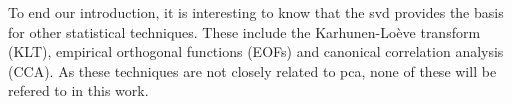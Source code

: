 To end our introduction, it is interesting to know that the \gls{svd} provides the basis for other statistical techniques.
These include the Karhunen-Loève transform (KLT), empirical orthogonal functions (EOFs) and canonical correlation analysis (CCA).
As these techniques are not closely related to \gls{pca}, none of these will be refered to in this work.





\clearpage





